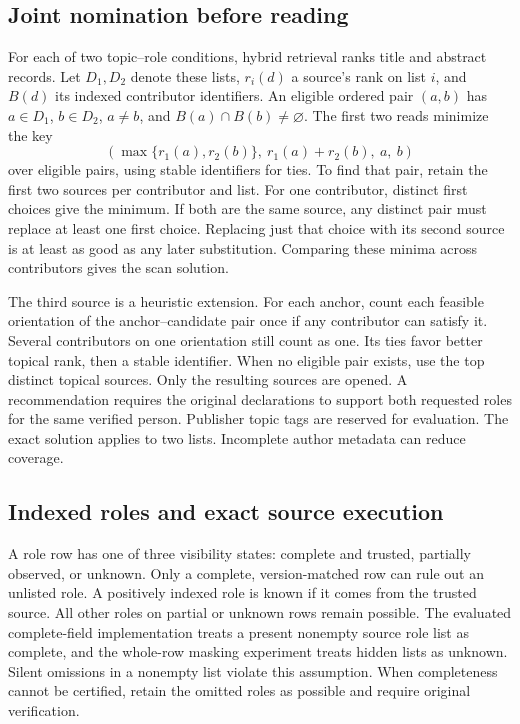 \documentclass[sigconf,natbib=true,anonymous=true,pbalance=true]{acmart}
\begin{document}
\subsection{Joint nomination before reading}
\label{sec:nomination}
For each of two topic--role conditions, hybrid retrieval ranks title and abstract records. Let $D_1,D_2$ denote these lists, $r_i(d)$ a source's rank on list $i$, and $B(d)$ its indexed contributor identifiers. An eligible ordered pair $(a,b)$ has $a\in D_1$, $b\in D_2$, $a\ne b$, and $B(a)\cap B(b)\ne\varnothing$. The first two reads minimize the key
\[
\left(\max\{r_1(a),r_2(b)\},\ r_1(a)+r_2(b),\ a,\ b\right)
\]
over eligible pairs, using stable identifiers for ties. To find that pair, retain the first two sources per contributor and list. For one contributor, distinct first choices give the minimum. If both are the same source, any distinct pair must replace at least one first choice. Replacing just that choice with its second source is at least as good as any later substitution. Comparing these minima across contributors gives the scan solution.

The third source is a heuristic extension. For each anchor, count each feasible orientation of the anchor--candidate pair once if any contributor can satisfy it. Several contributors on one orientation still count as one. Its ties favor better topical rank, then a stable identifier. When no eligible pair exists, use the top distinct topical sources. Only the resulting sources are opened. A recommendation requires the original declarations to support both requested roles for the same verified person. Publisher topic tags are reserved for evaluation. The exact solution applies to two lists. Incomplete author metadata can reduce coverage.

\subsection{Indexed roles and exact source execution}
A role row has one of three visibility states: complete and trusted, partially observed, or unknown. Only a complete, version-matched row can rule out an unlisted role. A positively indexed role is known if it comes from the trusted source. All other roles on partial or unknown rows remain possible. The evaluated complete-field implementation treats a present nonempty source role list as complete, and the whole-row masking experiment treats hidden lists as unknown. Silent omissions in a nonempty list violate this assumption. When completeness cannot be certified, retain the omitted roles as possible and require original verification.
\end{document}
